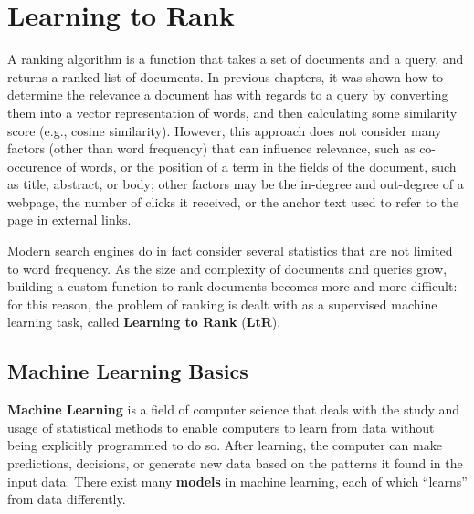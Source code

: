 \chapter{Learning to Rank}

A ranking algorithm is a function that takes a set of documents and a query, and returns a ranked list of documents. In previous chapters, it was shown how to determine the relevance a document has with regards to a query by converting them into a vector representation of words, and then calculating some similarity score (e.g., cosine similarity). However, this approach does not consider many factors (other than word frequency) that can influence relevance, such as co-occurence of words, or the position of a term in the fields of the document, such as title, abstract, or body; other factors may be the in-degree and out-degree of a webpage, the number of clicks it received, or the anchor text used to refer to the page in external links.

Modern search engines do in fact consider several statistics that are not limited to word frequency. As the size and complexity of documents and queries grow, building a custom function to rank documents becomes more and more difficult: for this reason, the problem of ranking is dealt with as a supervised machine learning task, called \textbf{Learning to Rank} (\textbf{LtR}).

\section{Machine Learning Basics}

\textbf{Machine Learning} is a field of computer science that deals with the study and usage of statistical methods to enable computers to learn from data without being explicitly programmed to do so. After learning, the computer can make predictions, decisions, or generate new data based on the patterns it found in the input data. There exist many \textbf{models} in machine learning, each of which ``learns'' from data differently. 

